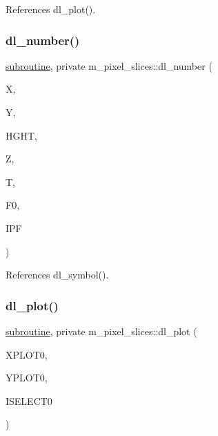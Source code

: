 References dl\+\_\+plot().

\mbox{\label{namespacem__pixel__slices_a7d9372496e88c384aea5ad1b26750d1b}} 
\subsubsection{\texorpdfstring{dl\+\_\+number()}{dl\_number()}}
{\footnotesize\ttfamily \hyperlink{M__stopwatch_83_8txt_acfbcff50169d691ff02d4a123ed70482}{subroutine}, private m\+\_\+pixel\+\_\+slices\+::dl\+\_\+number (\begin{DoxyParamCaption}\item[{}]{X,  }\item[{}]{Y,  }\item[{}]{H\+G\+HT,  }\item[{}]{Z,  }\item[{}]{T,  }\item[{}]{F0,  }\item[{}]{I\+PF }\end{DoxyParamCaption})\hspace{0.3cm}{\ttfamily [private]}}



References dl\+\_\+symbol().

\mbox{\label{namespacem__pixel__slices_aa70737b5f5945b2f513163ee5c40942d}} 
\subsubsection{\texorpdfstring{dl\+\_\+plot()}{dl\_plot()}}
{\footnotesize\ttfamily \hyperlink{M__stopwatch_83_8txt_acfbcff50169d691ff02d4a123ed70482}{subroutine}, private m\+\_\+pixel\+\_\+slices\+::dl\+\_\+plot (\begin{DoxyParamCaption}\item[{}]{X\+P\+L\+O\+T0,  }\item[{}]{Y\+P\+L\+O\+T0,  }\item[{}]{I\+S\+E\+L\+E\+C\+T0 }\end{DoxyParamCaption})\hspace{0.3cm}{\ttfamily [private]}}



